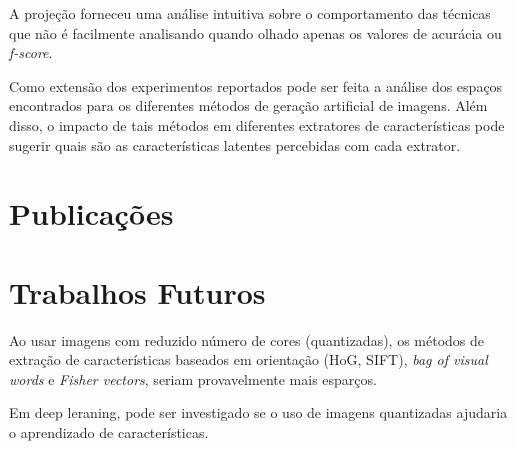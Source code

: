 A projeção forneceu uma análise intuitiva sobre o comportamento das técnicas que não é facilmente analisando quando olhado apenas os valores de acurácia ou \textit{f-score}.

Como extensão dos experimentos reportados pode ser feita a análise dos espaços encontrados para os diferentes métodos de geração artificial de imagens. Além disso, o impacto de tais métodos em diferentes extratores de características pode sugerir quais são as características latentes percebidas com cada extrator.


\section{Publicações}

\section{Trabalhos Futuros}

Ao usar imagens com reduzido número de cores (quantizadas), os métodos de extração de características baseados em orientação (HoG, SIFT), \textit{bag of visual words} e \textit{Fisher vectors}, seriam provavelmente mais esparços.

Em deep leraning, pode ser investigado se o uso de imagens quantizadas ajudaria o aprendizado de características.

%
%
%


